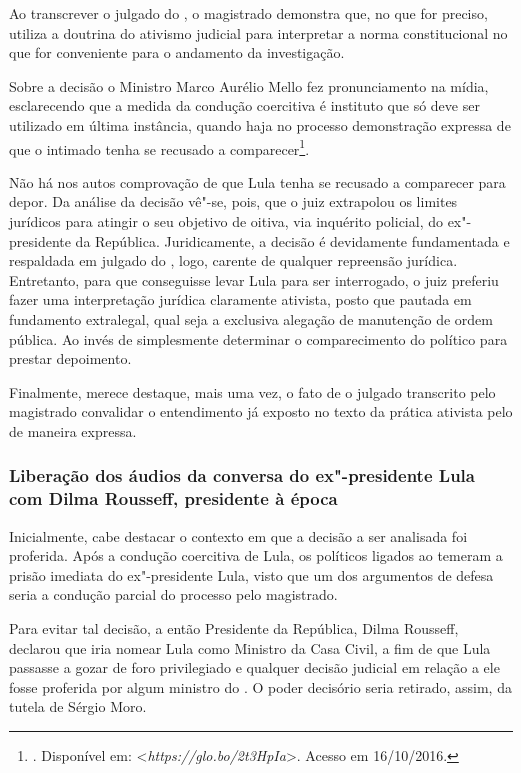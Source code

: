 Ao transcrever o julgado do , o magistrado demonstra que, no que
for preciso, utiliza a doutrina do ativismo judicial para interpretar a
norma constitucional no que for conveniente para o andamento da
investigação.

Sobre a decisão o Ministro Marco Aurélio Mello fez pronunciamento
na mídia, esclarecendo que a medida da condução coercitiva é instituto
que só deve ser utilizado em última instância, quando haja no processo
demonstração expressa de que o intimado tenha se recusado a
comparecer\footnote{. Disponível em: \textless{}\emph{https://glo.bo/2t3HpIa}\textgreater{}.
Acesso em 16/10/2016.}.

Não há nos autos comprovação de que Lula tenha se recusado a
comparecer para depor. Da análise da decisão vê"-se, pois, que o juiz
extrapolou os limites jurídicos para atingir o seu objetivo de oitiva,
via inquérito policial, do ex"-presidente da República. Juridicamente, a
decisão é devidamente fundamentada e respaldada em julgado do , logo,
carente de qualquer repreensão jurídica. Entretanto, para que
conseguisse levar Lula para ser interrogado, o juiz preferiu fazer uma
interpretação jurídica claramente ativista, posto que pautada em
fundamento extralegal, qual seja a exclusiva alegação de manutenção de
ordem pública. Ao invés de simplesmente determinar o comparecimento do
político para prestar depoimento.

Finalmente, merece destaque, mais uma vez, o fato de o julgado
transcrito pelo magistrado convalidar o entendimento já exposto no texto
da prática ativista pelo  de maneira expressa.

\subsubsection{Liberação dos áudios da conversa do ex"-presidente Lula
com Dilma Rousseff, presidente à época}

Inicialmente, cabe destacar o contexto em que a decisão a ser analisada
foi proferida. Após a condução coercitiva de Lula, os políticos ligados
ao  temeram a prisão imediata do ex"-presidente Lula, visto que um dos
argumentos de defesa seria a condução parcial do processo pelo
magistrado.

Para evitar tal decisão, a então Presidente da República, Dilma Rousseff,
declarou que iria nomear Lula como Ministro da Casa Civil, a fim de que
Lula passasse a gozar de foro privilegiado e qualquer decisão judicial
em relação a ele fosse proferida por algum ministro do . O poder
decisório seria retirado, assim, da tutela de Sérgio Moro.


